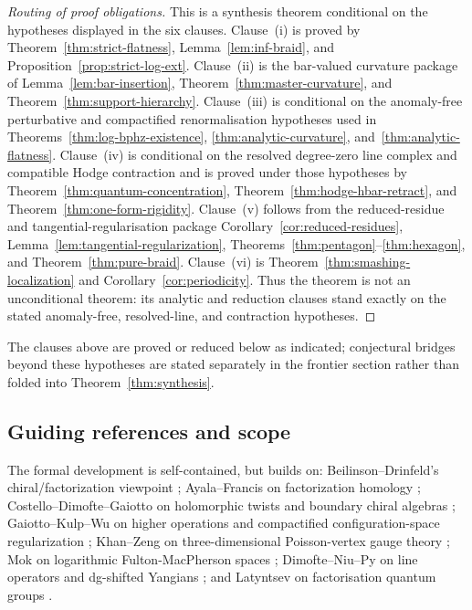 \begin{proof}[Routing of proof obligations]
This is a synthesis theorem conditional on the hypotheses displayed in
the six clauses.  Clause~\textup{(i)} is proved by
Theorem~\ref{thm:strict-flatness}, Lemma~\ref{lem:inf-braid}, and
Proposition~\ref{prop:strict-log-ext}.  Clause~\textup{(ii)} is the
bar-valued curvature package of Lemma~\ref{lem:bar-insertion},
Theorem~\ref{thm:master-curvature}, and
Theorem~\ref{thm:support-hierarchy}.  Clause~\textup{(iii)} is
conditional on the anomaly-free perturbative and compactified
renormalisation hypotheses used in
Theorems~\ref{thm:log-bphz-existence},
\ref{thm:analytic-curvature}, and~\ref{thm:analytic-flatness}.
Clause~\textup{(iv)} is conditional on the resolved degree-zero line
complex and compatible Hodge contraction and is proved under those
hypotheses by Theorem~\ref{thm:quantum-concentration},
Theorem~\ref{thm:hodge-hbar-retract}, and
Theorem~\ref{thm:one-form-rigidity}.  Clause~\textup{(v)} follows from
the reduced-residue and tangential-regularisation package
Corollary~\ref{cor:reduced-residues},
Lemma~\ref{lem:tangential-regularization},
Theorems~\ref{thm:pentagon}--\ref{thm:hexagon}, and
Theorem~\ref{thm:pure-braid}.  Clause~\textup{(vi)} is
Theorem~\ref{thm:smashing-localization} and
Corollary~\ref{cor:periodicity}.  Thus the theorem is not an
unconditional theorem: its analytic and reduction clauses stand exactly
on the stated anomaly-free, resolved-line, and contraction hypotheses.
\end{proof}

The clauses above are proved or reduced below as indicated; conjectural
bridges beyond these hypotheses are stated separately in the frontier
section rather than folded into Theorem~\ref{thm:synthesis}.

\subsection*{Guiding references and scope}
The formal development is self-contained, but builds on: Beilinson--Drinfeld's chiral/factorization viewpoint \cite{BD04}; Ayala--Francis on factorization homology \cite{AF15}; Costello--Dimofte--Gaiotto on holomorphic twists and boundary chiral algebras \cite{CDG20}; Gaiotto--Kulp--Wu on higher operations and compactified configuration-space regularization \cite{GKW25}; Khan--Zeng on three-dimensional Poisson-vertex gauge theory \cite{KZ25}; Mok on logarithmic Fulton-MacPherson spaces \cite{Mok25}; Dimofte--Niu--Py on line operators and dg-shifted Yangians \cite{DNP25}; and Latyntsev on factorisation quantum groups \cite{Lat23}.

